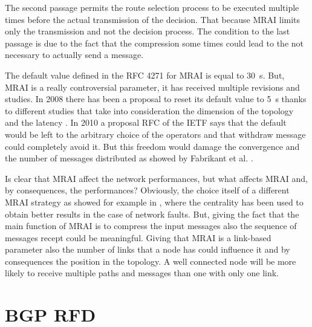 The second passage permits the route selection process to be executed multiple
times before the actual transmission of the decision.
That because \ac{MRAI} limits only the transmission and not the decision process.
The condition to the last passage is due to the fact that the compression some
times could lead to the not necessary to actually send a message.

The default value defined in the \ac{RFC} \num{4271} for \ac{MRAI} is equal to
\SI{30}{\second}.
But, \ac{MRAI} is a really controversial parameter, it has received multiple
revisions and studies.
In \num{2008} there has been a proposal to reset its default value to \SI{5}{\second}
\cite{jakma2008revised} thanks to different studies that take into consideration
the dimension of the topology and the latency \cite{qiu2005optimal}.
In \num{2010} a proposal \ac{RFC} of the \ac{IETF} \cite{jakma2010revisions}
says that the default would be left to the arbitrary choice of the operators and
that withdraw message could completely avoid it.
But this freedom would damage the convergence and the number of messages distributed
as showed by Fabrikant et al. \cite{fabrikant2011there}.

Is clear that \ac{MRAI} affect the network performances, but what affects \ac{MRAI}
and, by consequences, the performances?
Obviously, the choice itself of a different \ac{MRAI} strategy as showed for
example in \cite{milani2019BGP}, where the centrality has been used to obtain better
results in the case of network faults.
But, giving the fact that the main function of \ac{MRAI} is to compress the
input messages also the sequence of messages recept could be meaningful.
Giving that \ac{MRAI} is a link-based parameter also the number of links that
a node has could influence it and by consequences the position in the topology.
A well connected node will be more likely to receive multiple paths and messages
than one with only one link.


\section{BGP RFD}
\label{sec:bgp_rfd}

